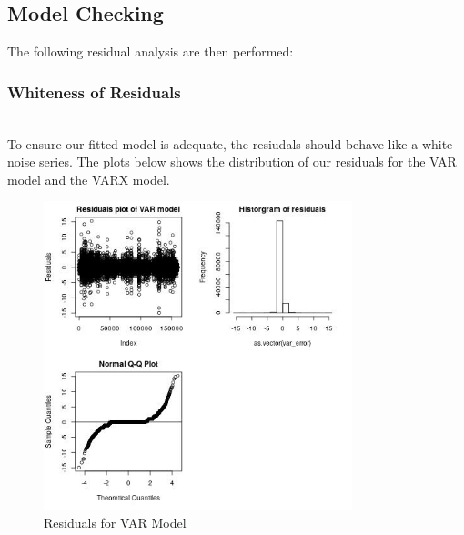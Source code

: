 \documentclass[nonblindrev,msom]{informs3} %
\begin{document}
\newpage
\subsection{Model Checking}
The following residual analysis are then performed:


\subsubsection{Whiteness of Residuals}
\hfill\\
To ensure our fitted model is adequate, the resiudals should behave like a white noise series. 
The plots below shows the distribution of our residuals for the VAR model and the VARX model. 

\begin{figure}[H]
    \centering
    \includegraphics[width=0.8\textwidth, height=0.42\textheight]{Images/Full_VAR_diff_resids.jpg}
    \caption{Residuals for VAR Model}
    \label{fig:Residuals for VAR Model}
\end{figure}
\end{document}
